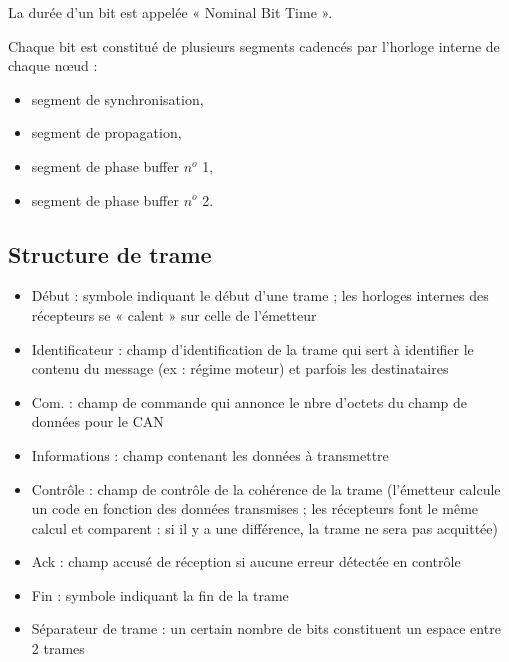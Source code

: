 La durée d'un bit est appelée « Nominal Bit Time ».

Chaque bit est constitué de plusieurs segments cadencés par l'horloge interne de chaque nœud :

\begin{itemize}
    \item segment de synchronisation,
    \item segment de propagation,
    \item segment de phase buffer $n^o$ 1,
    \item segment de phase buffer $n^o$ 2.
\end{itemize}

\subsection{Structure de trame}

\begin{itemize}
    \item Début : symbole indiquant le début d'une trame ; les horloges internes des récepteurs se « calent » sur celle de l’émetteur
    \item Identificateur : champ d'identification de la trame qui sert à identifier le contenu du message (ex : régime moteur) et parfois les destinataires
    \item Com. : champ de commande qui annonce le nbre d’octets du champ de données pour le CAN
    \item Informations : champ contenant les données à transmettre 
    \item Contrôle : champ de contrôle de la cohérence de la trame (l’émetteur calcule un code en fonction des données transmises ; les récepteurs font le même calcul et comparent : si il y a une différence, la trame ne sera pas acquittée)
    \item Ack : champ accusé de réception si aucune erreur détectée en contrôle
    \item Fin : symbole indiquant la fin de la trame
    \item Séparateur de trame : un certain nombre de bits constituent un espace entre 2 trames
\end{itemize}



